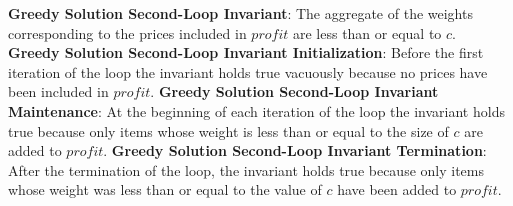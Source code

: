 \documentclass[onecolumn, 12pt, article]{IEEEtran}
\numberwithin{case}{problem}
\numberwithin{condition}{problem}
\numberwithin{condition}{subsection}
\numberwithin{definition}{section}
\theoremstyle{remark}
\numberwithin{question}{problem}
\theoremstyle{plain}
\numberwithin{answer}{problem}
\numberwithin{solution}{section}
\numberwithin{equation}{section}%
\begin{document}
\newline
\newline
\textbf{Greedy Solution Second-Loop Invariant}: The aggregate of the weights corresponding to the prices included in $profit$ are less than or equal to $c$.
\newline
\textbf{Greedy Solution Second-Loop Invariant Initialization}: Before the first iteration of the loop the invariant holds true vacuously because no prices have been included in $profit$.
\newline
\textbf{Greedy Solution Second-Loop Invariant Maintenance}: At the beginning of each iteration of the loop the invariant holds true because only items whose weight is less than or equal to the size of $c$ are added to $profit$.
\newline
\textbf{Greedy Solution Second-Loop Invariant Termination}: After the termination of the loop, the invariant holds true because only items whose weight was less than or equal to the value of $c$ have been added to $profit$.
\newline
\newline
\end{document}
